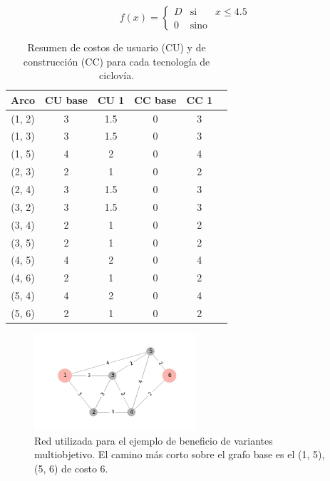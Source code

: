 $$
  f(x) = \left\{ \begin{array}{lcr}
          D & \mbox{si}   & x \leq 4.5 \\
          0 & \mbox{sino} &
        \end{array}
        \right.
$$

\begin{table}[h!]
  \centering
  \begin{tabular}{cccccc}
    \toprule
    Arco & CU base & CU 1 & CC base & CC 1 & \\
    \midrule
      (1, 2) & 3 & 1.5 & 0 & 3 \\
      (1, 3) & 3 & 1.5 & 0 & 3 \\
      (1, 5) & 4 & 2   & 0 & 4 \\
      (2, 3) & 2 & 1   & 0 & 2 \\
      (2, 4) & 3 & 1.5 & 0 & 3 \\
      (3, 2) & 3 & 1.5 & 0 & 3 \\
      (3, 4) & 2 & 1   & 0 & 2 \\
      (3, 5) & 2 & 1   & 0 & 2 \\
      (4, 5) & 4 & 2   & 0 & 4 \\
      (4, 6) & 2 & 1   & 0 & 2 \\
      (5, 4) & 4 & 2   & 0 & 4 \\
      (5, 6) & 2 & 1   & 0 & 2 \\
    \bottomrule
  \end{tabular}
    \caption{Resumen de costos de usuario (CU) y de construcción (CC) para cada tecnología de ciclovía.}\label{table:example2arccosts}
\end{table}

\begin{figure}[h!]
  \centering
  \includegraphics[width=6cm]{../resources/example_2_base.png}
  \caption{Red utilizada para el ejemplo de beneficio de variantes multiobjetivo. El camino más corto sobre el grafo base es el (1, 5), (5, 6) de costo 6.}
  \label{fig:example2base}
\end{figure}

\FloatBarrier

